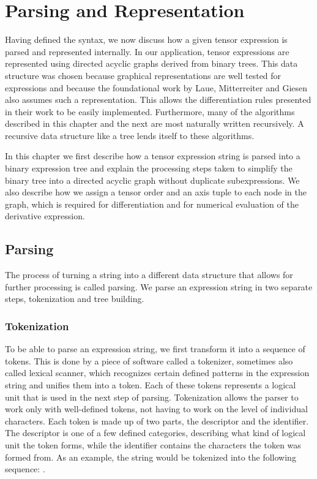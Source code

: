 \documentclass[12pt, a4paper]{report}
\begin{document}
\chapter{Parsing and Representation}
Having defined the syntax, we now discuss how a given tensor expression is parsed and represented internally.
In our application, tensor expressions are represented using directed acyclic graphs derived from binary trees.
This data structure was chosen because graphical representations are well tested for expressions and because the foundational work \cite{tensorpaper} by Laue, Mitterreiter and Giesen also assumes such a representation.
This allows the differentiation rules presented in their work to be easily implemented.
Furthermore, many of the algorithms described in this chapter and the next are most naturally written recursively.
A recursive data structure like a tree lends itself to these algorithms.

In this chapter we first describe how a tensor expression string is parsed into a binary expression tree and explain the processing steps taken to simplify the binary tree into a directed acyclic graph without duplicate subexpressions.
We also describe how we assign a tensor order and an axis tuple to each node in the graph, which is required for differentiation and for numerical evaluation of the derivative expression.

\section{Parsing}
The process of turning a string into a different data structure that allows for further processing is called parsing.
We parse an expression string in two separate steps, tokenization and tree building.

\subsection{Tokenization}
To be able to parse an expression string, we first transform it into a sequence of tokens.
This is done by a piece of software called a tokenizer, sometimes also called lexical scanner, which recognizes certain defined patterns in the expression string and unifies them into a token.
Each of these tokens represents a logical unit that is used in the next step of parsing.
Tokenization allows the parser to work only with well-defined tokens, not having to work on the level of individual characters.
Each token is made up of two parts, the descriptor and the identifier.
The descriptor is one of a few defined categories, describing what kind of logical unit the token forms, while the identifier contains the characters the token was formed from.
As an example, the string  would be tokenized into the following sequence: .
\end{document}
